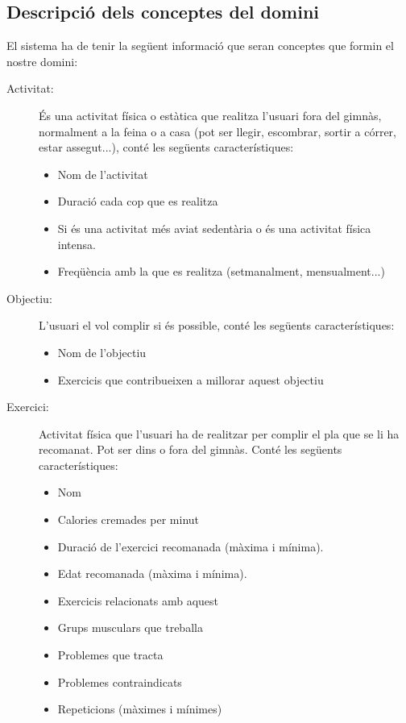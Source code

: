 \documentclass[a4paper, 12pt, UTF8]{article}
\begin{document}
\subsection{Descripció dels conceptes del domini} 

El sistema ha de tenir la següent informació que seran conceptes que formin el nostre domini:

\begin{description}
	\item[Activitat:] És una activitat física o estàtica que realitza l'usuari fora del gimnàs, normalment a la feina o a casa (pot ser llegir, escombrar, sortir a córrer, estar assegut...), conté les següents característiques:
	
	\begin{itemize}
		\item Nom de l'activitat
		\item Duració cada cop que es realitza
		\item Si és una activitat més aviat sedentària o és una activitat física intensa.  
		\item Freqüència amb la que es realitza (setmanalment, mensualment...)
	\end{itemize}
	
	\item[Objectiu:] L'usuari el vol complir si és possible, conté les següents característiques:
	\begin{itemize}
		\item Nom de l'objectiu
		\item Exercicis que contribueixen a millorar aquest objectiu
	\end{itemize}
	
	\item[Exercici:] Activitat física que l'usuari ha de realitzar per complir el pla que se li ha recomanat. Pot ser dins o fora del gimnàs. Conté les següents característiques:
	\begin{itemize}
		\item Nom
		\item Calories cremades per minut
		\item Duració de l'exercici recomanada (màxima i mínima).
		\item Edat recomanada (màxima i mínima).
		\item Exercicis relacionats amb aquest
		\item Grups musculars que treballa
		\item Problemes que tracta
		\item Problemes contraindicats
		\item Repeticions (màximes i mínimes)
	\end{itemize}
\end{description}
\end{document}
